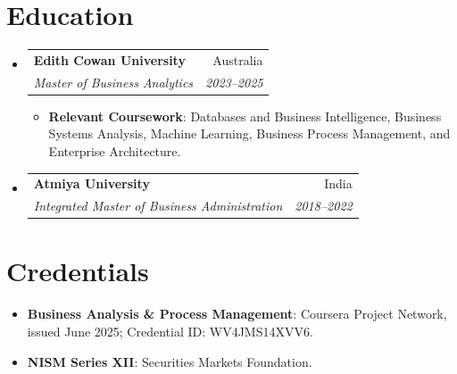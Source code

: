 \documentclass[letterpaper,9.5pt]{article}
\makeatletter
\newcommand{\resumeItem}[2]{
  \item\small{
    \textbf{#1}{: #2 \vspace{-2pt}}
  }
}
\newcommand{\resumeSubheading}[4]{
  \vspace{-1pt}\item
    \begin{tabular*}{0.97\textwidth}{l@{\extracolsep{\fill}}r}
      \textbf{#1} & #2 \\
      \textit{\small #3} & \textit{\small #4} \\
    \end{tabular*}\vspace{-5pt}
}
\newcommand{\resumeSubItem}[2]{\resumeItem{#1}{#2}\vspace{-4pt}}
\newcommand{\resumeSubHeadingListStart}{\begin{itemize}[leftmargin=*]}
\newcommand{\resumeSubHeadingListEnd}{\end{itemize}}
\newcommand{\resumeItemListStart}{\begin{itemize}}
\newcommand{\resumeItemListEnd}{\end{itemize}\vspace{-5pt}}
\makeatother
\begin{document}
\section{Education}
\resumeSubHeadingListStart
  \resumeSubheading
    {Edith Cowan University}{Australia}
    {Master of Business Analytics}{2023--2025}
    \resumeItemListStart
      \resumeItem{Relevant Coursework}
        {Databases and Business Intelligence, Business Systems Analysis, Machine Learning, Business Process Management, and Enterprise Architecture.}
    \resumeItemListEnd
  \resumeSubheading
    {Atmiya University}{India}
    {Integrated Master of Business Administration}{2018--2022}
\resumeSubHeadingListEnd

\section{Credentials}
\resumeSubHeadingListStart
  \resumeSubItem{Business Analysis \& Process Management}
    {Coursera Project Network, issued June 2025; Credential ID: WV4JMS14XVV6.}
  \resumeSubItem{NISM Series XII}
    {Securities Markets Foundation.}
\resumeSubHeadingListEnd
\end{document}
